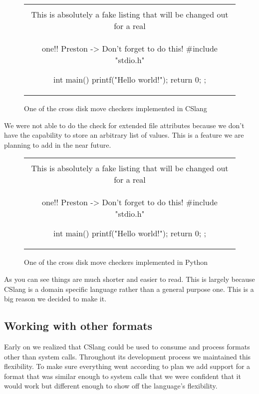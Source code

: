 \begin{figure}[H]
\centering
\begin{tabular}{c}
\begin{lstlisting}
\\ This is absolutely a fake listing that will be changed out for a real
\\ one!!  Preston -> Don't forget to do this!
#include "stdio.h"

int main() {
    printf("Hello world!\n");
    return 0;
};
\end{lstlisting}
\end{tabular}
\caption{One of the cross disk move checkers implemented in CSlang}
\label{lst:Cross-Disk Move}
\end{figure}

We were not able to do the check for extended file attributes because we
don't have the capability to store an arbitrary list of values.  This is a
feature we are planning to add in the near future.

\begin{figure}[H]
\centering
\begin{tabular}{c}
\begin{lstlisting}
\\ This is absolutely a fake listing that will be changed out for a real
\\ one!!  Preston -> Don't forget to do this!
#include "stdio.h"

int main() {
    printf("Hello world!\n");
    return 0;
};
\end{lstlisting}
\end{tabular}
\caption{One of the cross disk move checkers implemented in Python}
\label{lst:Cross-Disk Move}
\end{figure}

As you can see things are much shorter and easier to read.  This is largely
because CSlang is a domain specific language rather than a general purpose
one.  This is a big reason we decided to make it.


\subsection{Working with other formats}

Early on we realized that CSlang could be used to consume and process
formats other than system calls.  Throughout its development process
we maintained this flexibility.  To make sure everything went according to
plan we add support for a format that was similar enough to system calls
that we were confident that it would work but different enough to show off
the language's flexibility.

